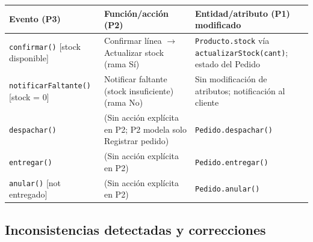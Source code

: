 \documentclass[12pt,a4paper]{article}
\begin{document}
    \begin{table}[H]
    \centering
    \begin{tabular}{@{}p{4.2cm}p{4.5cm}p{5.5cm}@{}}
    \toprule
    \textbf{Evento (P3)} & \textbf{Función/acción (P2)} & \textbf{Entidad/atributo (P1) modificado} \\
    \midrule
    \texttt{confirmar()} [stock disponible] & Confirmar línea $\rightarrow$ Actualizar stock (rama Sí) & \texttt{Producto.stock} vía \texttt{actualizarStock(cant)}; estado del Pedido \\
    \texttt{notificarFaltante()} [stock = 0] & Notificar faltante (stock insuficiente) (rama No) & Sin modificación de atributos; notificación al cliente \\
    \texttt{despachar()} & (Sin acción explícita en P2; P2 modela solo Registrar pedido) & \texttt{Pedido.despachar()} \\
    \texttt{entregar()} & (Sin acción explícita en P2) & \texttt{Pedido.entregar()} \\
    \texttt{anular()} [not entregado] & (Sin acción explícita en P2) & \texttt{Pedido.anular()} \\
    \bottomrule
    \end{tabular}
    \end{table}
    
    \subsection*{Inconsistencias detectadas y correcciones}
    
\end{document}
